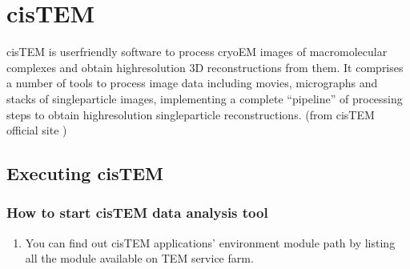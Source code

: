 \documentclass[a4paper,11pt,english]{sphinxmanual}
\begin{document}


\sphinxstepscope


\chapter{cisTEM}
\label{\detokenize{cisTEM:cistem}}\label{\detokenize{cisTEM::doc}}
\sphinxAtStartPar
cisTEM is user\sphinxhyphen{}friendly software to process cryo\sphinxhyphen{}EM images of macromolecular complexes and obtain high\sphinxhyphen{}resolution 3D reconstructions from them. It comprises a number of tools to process image data including movies, micrographs and stacks of single\sphinxhyphen{}particle images, implementing a complete “pipeline” of processing steps to obtain high\sphinxhyphen{}resolution single\sphinxhyphen{}particle reconstructions. (from cisTEM official site )


\section{Executing cisTEM}
\label{\detokenize{cisTEM:executing-cistem}}

\subsection{How to start cisTEM data analysis tool}
\label{\detokenize{cisTEM:how-to-start-cistem-data-analysis-tool}}\begin{enumerate}
%
\item {} 
\sphinxAtStartPar
You can find out cisTEM applications’ environment module path by listing all the module available on TEM service farm.

\end{enumerate}
\end{document}
